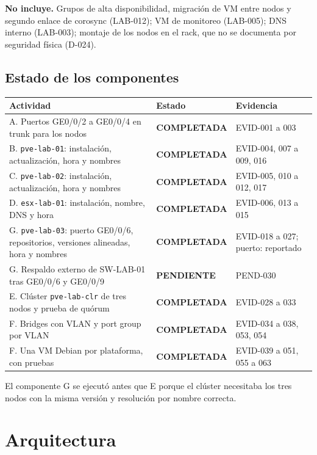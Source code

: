 \documentclass[11pt,a4paper]{article}
\newcommand{\estado}[1]{%
  \ifstrequal{#1}{COMPLETADA}{\textcolor{okgreen}{\textbf{\footnotesize #1}}}{%
  \ifstrequal{#1}{OPERATIVO VALIDADO}{\textcolor{okgreen}{\textbf{\footnotesize #1}}}{%
  \ifstrequal{#1}{OK}{\textcolor{okgreen}{\textbf{\footnotesize #1}}}{%
  \ifstrequal{#1}{RESUELTO}{\textcolor{okgreen}{\textbf{\footnotesize #1}}}{%
  \ifstrequal{#1}{EN CURSO}{\textcolor{amber}{\textbf{\footnotesize #1}}}{%
  \ifstrequal{#1}{REPORTADO}{\textcolor{amber}{\textbf{\footnotesize #1}}}{%
  \ifstrequal{#1}{NO EJECUTADA}{\textcolor{muted}{\textbf{\footnotesize #1}}}{%
  \ifstrequal{#1}{PROPUESTO}{\textcolor{violet}{\textbf{\footnotesize #1}}}{%
  \ifstrequal{#1}{PENDIENTE}{\textcolor{alertred}{\textbf{\footnotesize #1}}}{%
  \ifstrequal{#1}{FALLIDA}{\textcolor{alertred}{\textbf{\footnotesize #1}}}{%
  \textbf{\footnotesize #1}}}}}}}}}}}}
\newcommand{\cab}{\rowcolor{light}}
\begin{document}
\textbf{No incluye.} Grupos de alta disponibilidad, migración de VM entre nodos y segundo enlace de corosync (LAB-012); VM de monitoreo (LAB-005); DNS interno (LAB-003); montaje de los nodos en el rack, que no se documenta por seguridad física (D-024).

\subsection{Estado de los componentes}
\begin{tabularx}{\textwidth}{Z L{3.3cm} L{3.3cm}}
  \toprule
  \cab\textbf{Actividad} & \textbf{Estado} & \textbf{Evidencia}\\
  \midrule
  A. Puertos GE0/0/2 a GE0/0/4 en trunk para los nodos & \estado{COMPLETADA} & EVID-001 a 003\\
  B. \texttt{pve-lab-01}: instalación, actualización, hora y nombres & \estado{COMPLETADA} & EVID-004, 007 a 009, 016\\
  C. \texttt{pve-lab-02}: instalación, actualización, hora y nombres & \estado{COMPLETADA} & EVID-005, 010 a 012, 017\\
  D. \texttt{esx-lab-01}: instalación, nombre, DNS y hora & \estado{COMPLETADA} & EVID-006, 013 a 015\\
  G. \texttt{pve-lab-03}: puerto GE0/0/6, repositorios, versiones alineadas, hora y nombres & \estado{COMPLETADA} & EVID-018 a 027; puerto: reportado\\
  G. Respaldo externo de SW-LAB-01 tras GE0/0/6 y GE0/0/9 & \estado{PENDIENTE} & PEND-030\\
  E. Clúster \texttt{pve-lab-clr} de tres nodos y prueba de quórum & \estado{COMPLETADA} & EVID-028 a 033\\
  F. Bridges con VLAN y port group por VLAN & \estado{COMPLETADA} & EVID-034 a 038, 053, 054\\
  F. Una VM Debian por plataforma, con pruebas & \estado{COMPLETADA} & EVID-039 a 051, 055 a 063\\
  \bottomrule
\end{tabularx}

El componente G se ejecutó antes que E porque el clúster necesitaba los tres nodos con la misma versión y resolución por nombre correcta.

\section{Arquitectura}
\end{document}
